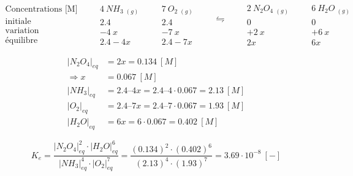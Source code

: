 \documentclass[
  11pt,
  french,
  a4paper,
  openany]{book}
\begin{document}
\begin{Answer}
\[
\begin{split}
  \text{Concentrations [M]} &\\
  \text{initiale} &\\
  \text{variation} &\\
  \text{équilibre} &
\end{split}
\quad
\begin{split}
  4\ NH_3\ _{(g)} &\\
  2.4 &\\
  -4\ x &\\
  2.4 - 4x &
\end{split}
\quad
\begin{split}
  7\ O_2\ _{(g)} &\\
  2.4 &\\
  -7\ x &\\
  2.4 - 7x &
\end{split}
\quad
\begin{split}
  \leftrightharpoons &\\
  ~ &\\
  ~ &\\
  ~ &
\end{split}
\quad
\begin{split}
  2\ N_2O_4\ _{(g)}\\
  0 &\\
  +2\ x &\\
  2x &
\end{split}
\quad
\begin{split}
  6\ H_2O\ _{(g)}\\
  0 &\\
  +6\ x &\\
  6x &
\end{split}
\]

\[
  \begin{split}
  |N_2O_4|_{eq} &= 2x = 0.134\ [M] \\
  \Rightarrow x &= 0.067\ [M] \\
  |NH_3|_{eq} &= 2.4 – 4x = 2.4 – 4 \cdot 0.067 = 2.13\ [M] \\ 
  |O_2|_{eq} &= 2.4 – 7x = 2.4 – 7 \cdot 0.067 = 1.93\ [M] \\ 
  |H_2O|_{eq} &= 6x = 6 \cdot 0.067 = 0.402\ [M]
  \end{split}
\]

\[
  K_{e} = \frac{|N_2O_4|^{2}_{eq} \cdot |H_2O|^{6}_{eq}}{|NH_3|^{4}_{eq} \cdot |O_2|^{7}_{eq}}
  = \frac{(0.134)^2 \cdot (0.402)^{6}}{(2.13)^{4} \cdot (1.93)^{7}} = 3.69 \cdot 10^{−8}\ [-]
\]

\end{Answer}
\end{document}

